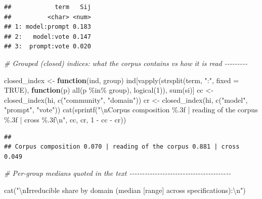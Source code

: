 \documentclass[
  11pt,
]{article}
\newenvironment{Shaded}{\begin{snugshade}}{\end{snugshade}}
\newcommand{\AttributeTok}[1]{\textcolor[rgb]{0.77,0.63,0.00}{#1}}
\newcommand{\CommentTok}[1]{\textcolor[rgb]{0.56,0.35,0.01}{\textit{#1}}}
\newcommand{\ConstantTok}[1]{\textcolor[rgb]{0.00,0.00,0.00}{#1}}
\newcommand{\ControlFlowTok}[1]{\textcolor[rgb]{0.13,0.29,0.53}{\textbf{#1}}}
\newcommand{\DecValTok}[1]{\textcolor[rgb]{0.00,0.00,0.81}{#1}}
\newcommand{\FunctionTok}[1]{\textcolor[rgb]{0.00,0.00,0.00}{#1}}
\newcommand{\NormalTok}[1]{#1}
\newcommand{\OtherTok}[1]{\textcolor[rgb]{0.56,0.35,0.01}{#1}}
\newcommand{\SpecialCharTok}[1]{\textcolor[rgb]{0.00,0.00,0.00}{#1}}
\newcommand{\StringTok}[1]{\textcolor[rgb]{0.31,0.60,0.02}{#1}}
\begin{document}
\begin{verbatim}
##            term   Sij
##          <char> <num>
## 1: model:prompt 0.183
## 2:   model:vote 0.147
## 3:  prompt:vote 0.020
\end{verbatim}

\begin{Shaded}
\begin{Highlighting}[]
\CommentTok{\# Grouped (closed) indices: what the corpus contains vs how it is read {-}{-}{-}{-}{-}{-}{-}{-}{-}}

\NormalTok{closed\_index }\OtherTok{\textless{}{-}} \ControlFlowTok{function}\NormalTok{(ind, group)}
\NormalTok{  ind[}\FunctionTok{vapply}\NormalTok{(}\FunctionTok{strsplit}\NormalTok{(term, }\StringTok{":"}\NormalTok{, }\AttributeTok{fixed =} \ConstantTok{TRUE}\NormalTok{),}
             \ControlFlowTok{function}\NormalTok{(p) }\FunctionTok{all}\NormalTok{(p }\SpecialCharTok{\%in\%}\NormalTok{ group), }\FunctionTok{logical}\NormalTok{(}\DecValTok{1}\NormalTok{)), }\FunctionTok{sum}\NormalTok{(si)]}
\NormalTok{cc }\OtherTok{\textless{}{-}} \FunctionTok{closed\_index}\NormalTok{(hi, }\FunctionTok{c}\NormalTok{(}\StringTok{"community"}\NormalTok{, }\StringTok{"domain"}\NormalTok{))}
\NormalTok{cr }\OtherTok{\textless{}{-}} \FunctionTok{closed\_index}\NormalTok{(hi, }\FunctionTok{c}\NormalTok{(}\StringTok{"model"}\NormalTok{, }\StringTok{"prompt"}\NormalTok{, }\StringTok{"vote"}\NormalTok{))}
\FunctionTok{cat}\NormalTok{(}\FunctionTok{sprintf}\NormalTok{(}\StringTok{"}\SpecialCharTok{\textbackslash{}n}\StringTok{Corpus composition \%.3f | reading of the corpus \%.3f | cross \%.3f}\SpecialCharTok{\textbackslash{}n}\StringTok{"}\NormalTok{,}
\NormalTok{            cc, cr, }\DecValTok{1} \SpecialCharTok{{-}}\NormalTok{ cc }\SpecialCharTok{{-}}\NormalTok{ cr))}
\end{Highlighting}
\end{Shaded}

\begin{verbatim}
## 
## Corpus composition 0.070 | reading of the corpus 0.881 | cross 0.049
\end{verbatim}

\begin{Shaded}
\begin{Highlighting}[]
\CommentTok{\# Per{-}group medians quoted in the text {-}{-}{-}{-}{-}{-}{-}{-}{-}{-}{-}{-}{-}{-}{-}{-}{-}{-}{-}{-}{-}{-}{-}{-}{-}{-}{-}{-}{-}{-}{-}{-}{-}{-}{-}{-}{-}{-}{-}{-}}

\FunctionTok{cat}\NormalTok{(}\StringTok{"}\SpecialCharTok{\textbackslash{}n}\StringTok{Irreducible share by domain (median [range] across specifications):}\SpecialCharTok{\textbackslash{}n}\StringTok{"}\NormalTok{)}
\end{Highlighting}
\end{Shaded}
\end{document}
